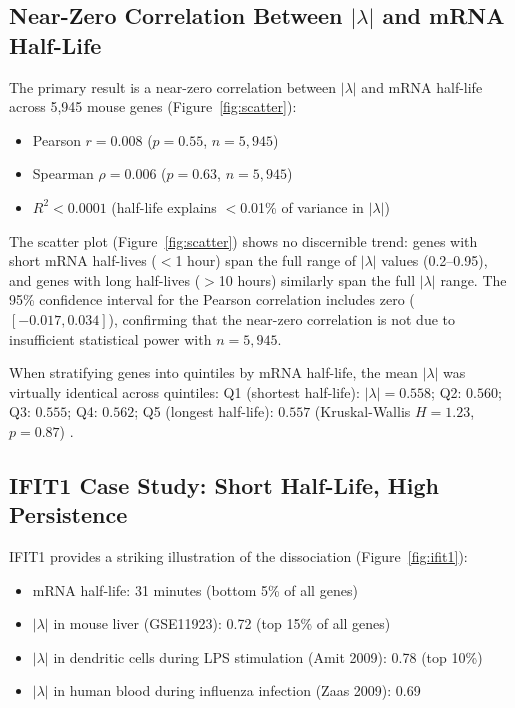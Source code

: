 \documentclass[11pt,letterpaper]{article}
\begin{document}
\subsection{Near-Zero Correlation Between $|\lambda|$ and mRNA Half-Life}

The primary result is a near-zero correlation between $|\lambda|$ and mRNA half-life across 5,945 mouse genes (Figure~\ref{fig:scatter}):

\begin{itemize}
\item Pearson $r = 0.008$ ($p = 0.55$, $n = 5{,}945$)
\item Spearman $\rho = 0.006$ ($p = 0.63$, $n = 5{,}945$)
\item $R^2 < 0.0001$ (half-life explains $<$0.01\% of variance in $|\lambda|$)
\end{itemize}

The scatter plot (Figure~\ref{fig:scatter}) shows no discernible trend: genes with short mRNA half-lives ($<$1 hour) span the full range of $|\lambda|$ values (0.2--0.95), and genes with long half-lives ($>$10 hours) similarly span the full $|\lambda|$ range. The 95\% confidence interval for the Pearson correlation includes zero ($[-0.017, 0.034]$), confirming that the near-zero correlation is not due to insufficient statistical power with $n = 5{,}945$.

When stratifying genes into quintiles by mRNA half-life, the mean $|\lambda|$ was virtually identical across quintiles: Q1 (shortest half-life): $|\lambda| = 0.558$; Q2: $0.560$; Q3: $0.555$; Q4: $0.562$; Q5 (longest half-life): $0.557$ (Kruskal-Wallis $H = 1.23$, $p = 0.87$) \citep{kruskal1952use}.

\subsection{IFIT1 Case Study: Short Half-Life, High Persistence}

IFIT1 provides a striking illustration of the dissociation (Figure~\ref{fig:ifit1}):

\begin{itemize}
\item mRNA half-life: 31 minutes (bottom 5\% of all genes) \citep{sharova2009database}
\item $|\lambda|$ in mouse liver (GSE11923): 0.72 (top 15\% of all genes)
\item $|\lambda|$ in dendritic cells during LPS stimulation (Amit 2009): 0.78 (top 10\%)
\item $|\lambda|$ in human blood during influenza infection (Zaas 2009): 0.69
\end{itemize}
\end{document}

